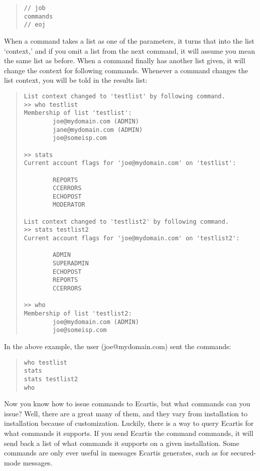 \documentclass{book}
\begin{document}
\begin{quote}
\footnotesize
\begin{verbatim}
// job
commands
// eoj
\end{verbatim}
\end{quote}
   
   
When a command takes a list as one of the parameters, it turns that into the
list `context,' and if you omit a list from the next command, it will assume
you mean the same list as before.  When a command finally has another list
given, it will change the context for following commands.  Whenever a command
changes the list context, you will be told in the results list:
   
\begin{quote}
\footnotesize
\begin{verbatim}
List context changed to 'testlist' by following command.
>> who testlist
Membership of list 'testlist':
        joe@mydomain.com (ADMIN)
        jane@mydomain.com (ADMIN)
        joe@someisp.com

>> stats
Current account flags for 'joe@mydomain.com' on 'testlist':

        REPORTS
        CCERRORS
        ECHOPOST
        MODERATOR

List context changed to 'testlist2' by following command.
>> stats testlist2
Current account flags for 'joe@mydomain.com' on 'testlist2':

        ADMIN
        SUPERADMIN
        ECHOPOST
        REPORTS
        CCERRORS

>> who
Membership of list 'testlist2:
        joe@mydomain.com (ADMIN)
        joe@someisp.com
\end{verbatim}
\end{quote}
   
In the above example, the user (joe@mydomain.com) sent the commands:
   
   
\begin{quote}
\footnotesize
\begin{verbatim}
who testlist
stats
stats testlist2
who
\end{verbatim}
\end{quote}
   
Now you know how to issue commands to Ecartis, but what commands can you
issue?  Well, there are a great many of them, and they vary from installation
to installation because of customization.  Luckily, there is a way to query
Ecartis for what commands it supports.  If you send Ecartis the command
commands, it will send back a list of what commands it supports on a given
installation.  Some commands are only ever useful in messages Ecartis
generates, such as for secured-mode messages.
   
\end{document}
